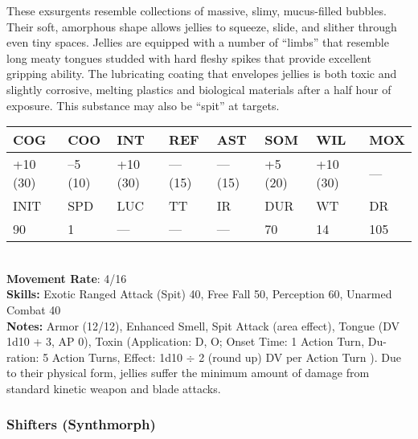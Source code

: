 These exsurgents resemble collections of massive, slimy, mucus-filled bubbles. Their soft, amorphous shape allows jellies to squeeze, slide, and slither through even tiny spaces. Jellies are equipped with a number of ``limbs'' that resemble long meaty tongues studded with hard fleshy spikes that provide excellent gripping ability. The lubricating coating that envelopes jellies is both toxic and slightly corrosive, melting plastics and biological materials after a half hour of exposure. This substance may also be ``spit'' at targets.\\ \begin{tabular}{|l|l|l|l|l|l|l|l|} \hline

COG &COO &INT &REF &AST &SOM &WIL &MOX \\ \hline

+10 (30) &–5 (10) &+10 (30) &— (15) &— (15) &+5 (20) &+10 (30) &— \\ \hline

INIT &SPD &LUC &TT &IR &DUR &WT &DR \\ \hline

90 &1 &— &— &— &70 &14 &105 \\ \hline

\end{tabular} \\ \textbf{Movement Rate}: 4/16 \\ \textbf{Skills:} Exotic Ranged Attack (Spit) 40, Free Fall 50, Perception 60, Unarmed Combat 40 \\ \textbf{Notes:} Armor (12/12), Enhanced Smell, Spit Attack (area effect), Tongue (DV 1d10 + 3, AP 0), Toxin (Application: D, O; Onset Time: 1 Action Turn, Du- ration: 5 Action Turns, Effect: 1d10 $\div$ 2 (round up) DV per Action Turn ). Due to their physical form, jellies suffer the minimum amount of damage from standard kinetic weapon and blade attacks. 

\subsubsection{Shifters (Synthmorph)} 

